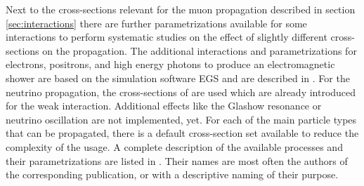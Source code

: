 Next to the cross-sections relevant for the muon propagation described in section \ref{sec:interactions} there are further parametrizations available for some interactions to perform systematic studies on the effect of slightly different cross-sections on the propagation.
The additional interactions and parametrizations for electrons, positrons, and high energy photons to produce an electromagnetic shower are based on the simulation software EGS \cite{EGS5} and are described in \cite{Alameddine20Master}.
For the neutrino propagation, the cross-sections of \cite{CSMS11NuXsection} are used which are already introduced for the weak interaction.
Additional effects like the Glashow resonance or neutrino oscillation are not implemented, yet.
For each of the main particle types that can be propagated, there is a default cross-section set available to reduce the complexity of the usage.
A complete description of the available processes and their parametrizations are listed in .
Their names are most often the authors of the corresponding publication, or with a descriptive naming of their purpose.
